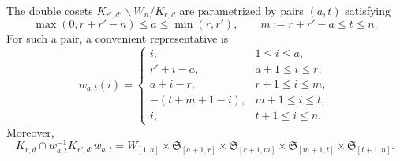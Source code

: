\documentclass[10pt,a4paper]{amsart}
\def\min{{\operatorname{min}\nolimits}}
\begin{document}
\begin{theorem}\label{Prop:TypeBC}
The double cosets $K_{r',d'}\backslash W_n/K_{r,d}$ are parametrized by pairs $(a,t)$ satisfying
\[
\max(0,r+r'-n)\le a\le \min(r,r'),
\qquad
m:=r+r'-a\le t\le n.
\]
For such a pair, a convenient representative is
\[
w_{a,t}(i)=
\begin{cases}
 i, & 1\le i\le a,\\
 r'+i-a, & a+1\le i\le r,\\
 a+i-r, & r+1\le i\le m,\\
 -(t+m+1-i), & m+1\le i\le t,\\
 i, & t+1\le i\le n.
\end{cases}
\]
Moreover,
\[
K_{r,d}\cap w_{a,t}^{-1}K_{r',d'}w_{a,t}
=
W_{[1,a]}
\times\mathfrak S_{[a+1,r]}
\times\mathfrak S_{[r+1,m]}
\times\mathfrak S_{[m+1,t]}
\times\mathfrak S_{[t+1,n]}.
\]
\end{theorem}
\end{document}
